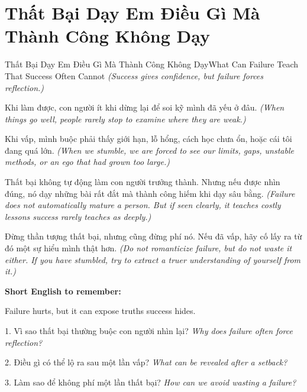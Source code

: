 \section{Thất Bại Dạy Em Điều Gì Mà Thành Công Không Dạy}
\begin{truyen}{Thất Bại Dạy Em Điều Gì Mà Thành Công Không Dạy}{What Can Failure Teach That Success Often Cannot}
\textit{(Success gives confidence, but failure forces reflection.)}

Khi làm được, con người ít khi dừng lại để soi kỹ mình đã yếu ở đâu.
\textit{(When things go well, people rarely stop to examine where they are weak.)}

Khi vấp, mình buộc phải thấy giới hạn, lỗ hổng, cách học chưa ổn, hoặc cái tôi đang quá lớn.
\textit{(When we stumble, we are forced to see our limits, gaps, unstable methods, or an ego that had grown too large.)}

Thất bại không tự động làm con người trưởng thành. Nhưng nếu được nhìn đúng, nó dạy những bài rất đắt mà thành công hiếm khi dạy sâu bằng.
\textit{(Failure does not automatically mature a person. But if seen clearly, it teaches costly lessons success rarely teaches as deeply.)}
\end{truyen}

\begin{baihoc}
Đừng thần tượng thất bại, nhưng cũng đừng phí nó. Nếu đã vấp, hãy cố lấy ra từ đó một sự hiểu mình thật hơn.
\textit{(Do not romanticize failure, but do not waste it either. If you have stumbled, try to extract a truer understanding of yourself from it.)}
\end{baihoc}

\begin{ghinhoanh}
\textbf{Short English to remember:}

Failure hurts, but it can expose truths success hides.

\end{ghinhoanh}

\begin{tuhocnhanh}
1. Vì sao thất bại thường buộc con người nhìn lại? \textit{Why does failure often force reflection?}

2. Điều gì có thể lộ ra sau một lần vấp? \textit{What can be revealed after a setback?}

3. Làm sao để không phí một lần thất bại? \textit{How can we avoid wasting a failure?}
\end{tuhocnhanh}
\ngancach

